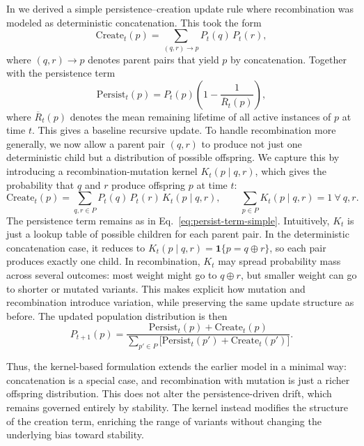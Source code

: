 \documentclass[life,article,submit,pdftex,moreauthors]{Definitions/mdpi}
\begin{document}
In \cite{adler_sda} we derived a simple persistence–creation update rule where 
recombination was modeled as deterministic concatenation. This took the form
\begin{equation}
\label{eq:create-term-simple}
\mathrm{Create}_t(p) = \sum_{(q,r)\to p} P_t(q)\,P_t(r),
\end{equation}
where $(q,r)\to p$ denotes parent pairs that yield $p$ by concatenation. 
Together with the persistence term
\begin{equation}
\label{eq:persist-term-simple}
\mathrm{Persist}_t(p) = P_t(p)\left(1-\frac{1}{\overline{R}_t(p)}\right),
\end{equation}
where $\overline{R}_t(p)$ denotes the mean remaining lifetime of all active
instances of $p$ at time $t$. This gives a baseline recursive update. To handle recombination more generally, we now allow a parent pair $(q,r)$ 
to produce not just one deterministic child but a distribution of possible
offspring. We capture this by introducing a recombination-mutation kernel
$K_t(p\mid q,r)$, which gives the probability that $q$ and $r$ produce
offspring $p$ at time $t$:
\begin{equation}
\label{eq:create-term-kernel}
\mathrm{Create}_t(p) = \sum_{q,r\in P} P_t(q)\,P_t(r)\,K_t(p\mid q,r),
\qquad \sum_{p\in P} K_t(p\mid q,r)=1~\forall~q,r.
\end{equation}
The persistence term remains as in Eq.~\ref{eq:persist-term-simple}. Intuitively, $K_t$ is just a lookup table of possible children for each 
parent pair. In the deterministic concatenation case, it reduces to 
$K_t(p\mid q,r)=\mathbf{1}\{p=q\oplus r\}$, so each pair produces exactly 
one child. In recombination, $K_t$ may spread probability mass across 
several outcomes: most weight might go to $q\oplus r$, but smaller weight 
can go to shorter or mutated variants. This makes explicit how mutation 
and recombination introduce variation, while preserving the same update 
structure as before. The updated population distribution is then
\begin{equation}
\label{eq:full-ba-update}
P_{t+1}(p) = \frac{\mathrm{Persist}_t(p) + \mathrm{Create}_t(p)}
{\sum_{p' \in P} \big[\mathrm{Persist}_t(p') + \mathrm{Create}_t(p')\big]}.
\end{equation}

Thus, the kernel-based formulation extends the earlier model in a minimal
way: concatenation is a special case, and recombination with mutation is
just a richer offspring distribution. This does not alter the persistence-driven drift, which remains governed entirely by stability. The kernel instead modifies the structure of the creation term, enriching the range of variants without changing the underlying bias toward stability.
\end{document}
